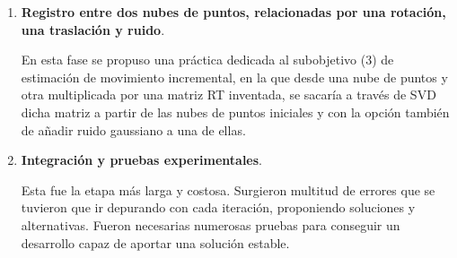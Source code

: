 \begin{enumerate}
\item \textbf{Registro entre dos nubes de puntos, relacionadas por una rotación, una traslación y ruido}.

En esta fase se propuso una práctica dedicada al subobjetivo (3) de estimación de movimiento incremental, en la que desde una nube de puntos y otra multiplicada por una matriz RT inventada, se sacaría a través de SVD dicha matriz a partir de las nubes de puntos iniciales y con la opción también de añadir ruido gaussiano a una de ellas.

\item \textbf{Integración y pruebas experimentales}.

Esta fue la etapa más larga y costosa. Surgieron multitud de errores que se tuvieron que ir depurando con cada iteración, proponiendo soluciones y alternativas. Fueron necesarias numerosas pruebas para conseguir un desarrollo capaz de aportar una solución estable.

\end{enumerate}